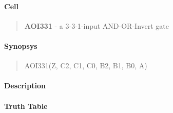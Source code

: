 \label{AOI331}
\paragraph{Cell}
\begin{quote}
    \textbf{AOI331} - a 3-3-1-input AND-OR-Invert gate
\end{quote}

\paragraph{Synopsys}
\begin{quote}
    AOI331(Z, C2, C1, C0, B2, B1, B0, A)
\end{quote}

\paragraph{Description}



\paragraph{Truth Table}



